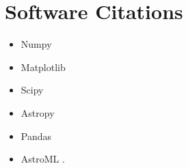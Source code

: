 \documentclass[fleqn,usenatbib]{mnras}
\begin{document}
\section*{Software Citations \label{sec:soft}}

\begin{itemize}
\item Numpy \citep{harris2020array}
\item Matplotlib \citep{Hunter:2007}
\item Scipy \citep{2020SciPy-NMeth}
\item Astropy \citep{astropy-1, astropy-2}
\item Pandas \citep{pandas}
\item AstroML \citep{2012cidu.conf...47V}.
\end{itemize}



\newpage











\bsp	%
\label{lastpage}
\end{document}

